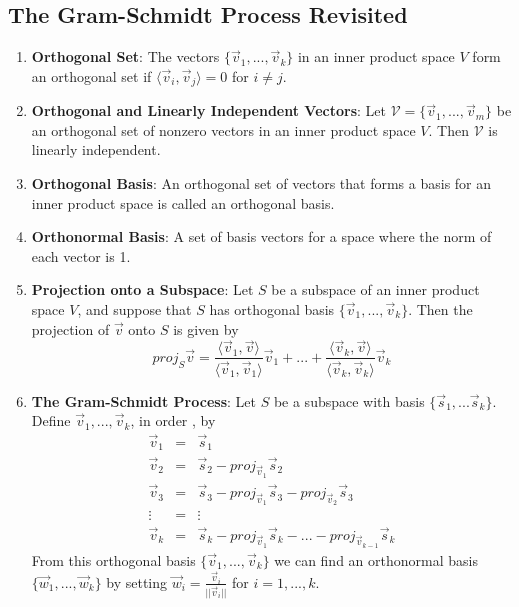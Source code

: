 \documentclass[10pt]{article}
\begin{document}
\subsection{The Gram-Schmidt Process Revisited}
\begin{enumerate}
\item \textbf{Orthogonal Set}: The vectors $\lbrace \vec{v}_1, ..., \vec{v}_k \rbrace$ in an inner product space $V$ form an orthogonal set if $\langle \vec{v}_i, \vec{v}_j \rangle = 0$ for $i \neq j$.
\item \textbf{Orthogonal and Linearly Independent Vectors}: Let $\mathcal{V} = \lbrace \vec{v}_1, ..., \vec{v}_m \rbrace$ be an orthogonal set of nonzero vectors in an inner product space $V$. Then $\mathcal{V}$ is linearly independent.
\item \textbf{Orthogonal Basis}: An orthogonal set of vectors that forms a basis for an inner product space is called an orthogonal basis.
\item \textbf{Orthonormal Basis}: A set of basis vectors for a space where the norm of each vector is 1.
\item \textbf{Projection onto a Subspace}: Let $S$ be a subspace of an inner product space $V$, and suppose that $S$ has orthogonal basis $\lbrace \vec{v}_1,...,\vec{v}_k \rbrace$. Then the projection of $\vec{v}$ onto $S$ is given by
$$proj_S\vec{v} = \frac{\langle \vec{v}_1,\vec{v} \rangle}{\langle \vec{v}_1,\vec{v}_1 \rangle}\vec{v}_1 + ... + \frac{\langle \vec{v}_k,\vec{v} \rangle}{\langle \vec{v}_k,\vec{v}_k \rangle}\vec{v}_k$$
\item \textbf{The Gram-Schmidt Process}: Let $S$ be a subspace with basis $\lbrace \vec{s}_1,...\vec{s}_k \rbrace$. Define $\vec{v}_1,...,\vec{v}_k$, in order , by
\begin{eqnarray*}
\vec{v}_1 &=& \vec{s}_1 \\
\vec{v}_2 &=& \vec{s}_2 - proj_{\vec{v}_1}\vec{s}_2 \\
\vec{v}_3 &=& \vec{s}_3 - proj_{\vec{v}_1}\vec{s}_3 - proj_{\vec{v}_2}\vec{s}_3 \\
\vdots &=& \vdots \\
\vec{v}_k &=& \vec{s}_k - proj_{\vec{v}_1}\vec{s}_k - ... - proj_{\vec{v}_{k-1}}\vec{s}_k
\end{eqnarray*}
From this orthogonal basis $\lbrace \vec{v}_1, ..., \vec{v}_k \rbrace$ we can find an orthonormal basis $\lbrace \vec{w}_1,...,\vec{w}_k \rbrace$ by setting $\vec{w}_i = \frac{\vec{v}_i}{||\vec{v}_i||}$ for $i = 1,...,k$.
\end{enumerate}
\end{document}
